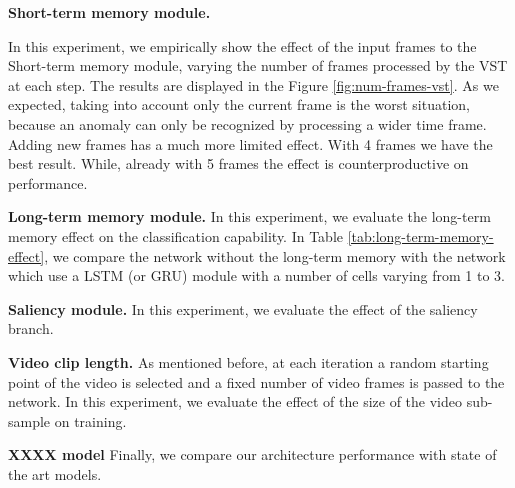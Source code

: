
\noindent\textbf{Short-term memory module.}

In this experiment, we empirically show the effect of the input frames to the Short-term memory module, varying the number of frames processed by the VST at each step.
The results are displayed in the Figure \ref{fig:num-frames-vst}.
As we expected, taking into account only the current frame is the worst situation, because an anomaly can only be recognized by processing a wider time frame.
Adding new frames has a much more limited effect.
With 4 frames we have the best result.
While, already with 5 frames the effect is counterproductive on performance.


\noindent\textbf{Long-term memory module.}
In this experiment, we evaluate the long-term memory effect on the classification capability.
In Table \ref{tab:long-term-memory-effect}, we compare the network without the long-term memory with the network which use a LSTM (or GRU) module with a number of cells varying from 1 to 3.

\noindent\textbf{Saliency module.}
In this experiment, we evaluate the effect of the saliency branch.

\noindent\textbf{Video clip length.}
As mentioned before, at each iteration a random starting point of the video is selected and a fixed number of video frames is passed to the network.
In this experiment, we evaluate the effect of the size of the video sub-sample on training.


\noindent\textbf{XXXX model}
Finally, we compare our architecture performance with state of the art models.